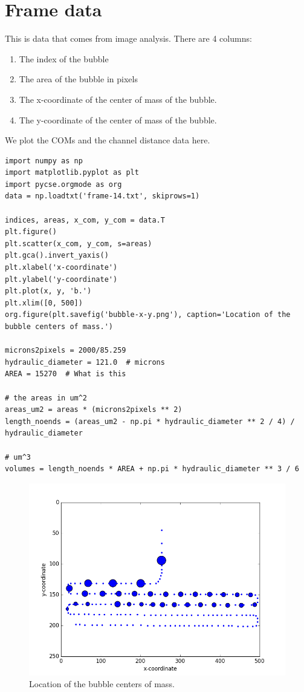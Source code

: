 \documentclass[11pt]{article}
\begin{document}
\section{Frame data}
\label{sec:orgheadline2}

This is data that comes from image analysis. There are 4 columns:
\begin{enumerate}
\item The index of the bubble
\item The area of the bubble in pixels
\item The x-coordinate of the center of mass of the bubble.
\item The y-coordinate of the center of mass of the bubble.
\end{enumerate}

We plot the COMs and the channel distance data here.

\begin{verbatim}
import numpy as np
import matplotlib.pyplot as plt
import pycse.orgmode as org
data = np.loadtxt('frame-14.txt', skiprows=1)

indices, areas, x_com, y_com = data.T
plt.figure()
plt.scatter(x_com, y_com, s=areas)
plt.gca().invert_yaxis()
plt.xlabel('x-coordinate')
plt.ylabel('y-coordinate')
plt.plot(x, y, 'b.')
plt.xlim([0, 500])
org.figure(plt.savefig('bubble-x-y.png'), caption='Location of the bubble centers of mass.')

microns2pixels = 2000/85.259
hydraulic_diameter = 121.0  # microns
AREA = 15270  # What is this

# the areas in um^2
areas_um2 = areas * (microns2pixels ** 2)
length_noends = (areas_um2 - np.pi * hydraulic_diameter ** 2 / 4) / hydraulic_diameter

# um^3
volumes = length_noends * AREA + np.pi * hydraulic_diameter ** 3 / 6
\end{verbatim}

\begin{figure}[htb]
\centering
\includegraphics[width=.9\linewidth]{bubble-x-y.png}
\caption{Location of the bubble centers of mass.}
\end{figure}
\end{document}
